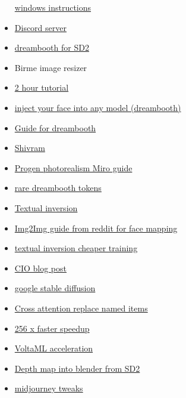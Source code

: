 \begin{itemize}
  \href{https://pastebin.com/xcFpp9Mr}{windows instructions}
\item
  \href{https://discord.com/channels/1023277529424986162/}{Discord
  server}
\item
  \href{https://github.com/nitrosocke/dreambooth-training-guide/blob/main/README.md\#how-to-fine-tune-stable-diffusion-20}{dreambooth
  for SD2}
\item
  Birme image resizer
\item
  \href{https://www.youtube.com/watch?v=Bdl-jWR3Ukc\&t=34}{2 hour
  tutorial}
\item
  \href{https://www.youtube.com/watch?v=s25hcW4zq4M}{inject your face
  into any model (dreambooth)}
\item
  \href{https://github.com/nitrosocke/dreambooth-training-guide}{Guide
  for dreambooth}
\item
  \href{https://github.com/ShivamShrirao/diffusers/tree/main/examples/dreambooth}{Shivram}
\item
  \href{https://miro.com/app/board/uXjVPzJyAtU=/}{Progen photorealism
  Miro guide}
\item
  \href{https://github.com/2kpr/dreambooth-tokens}{rare dreambooth
  tokens}
\item
  \href{https://www.reddit.com/r/StableDiffusion/comments/10gs4s2/new_expert_tutorial_for_textual_inversion_text/}{Textual
  inversion}
\item
  \href{https://www.reddit.com/r/StableDiffusion/comments/xgurs3/testing_img2img_batch_processing_i_convert_this/}{Img2Img
  guide from reddit for face mapping}
\item
  \href{https://github.com/rinongal/textual_inversion}{textual inversion
  cheaper training}
\item
  \href{https://danieljeffries.substack.com/p/the-turning-point-for-truly-open?sd=pf}{CIO
  blog post}
\item
  \href{https://www.youtube.com/watch?v=lHcPtbZ0Mnc}{google stable
  diffusion}
\item
  \href{https://github.com/bloc97/CrossAttentionControl}{Cross attention
  replace named items}
\item
  \href{https://the-decoder.com/stable-diffusion-could-soon-generate-images-much-faster/}{256
  x faster speedup}
\item
  \href{https://github.com/VoltaML/voltaML-fast-stable-diffusion}{VoltaML
  acceleration}
\item
  \href{https://www.youtube.com/watch?v=AeDngG9kQNI}{Depth map into
  blender from SD2}
\item
  \href{https://www.reddit.com/r/StableDiffusion/comments/z622mp/trained_midjourney_embedding_on_stable_diffusion/}{midjourney
  tweaks}


\end{itemize}
